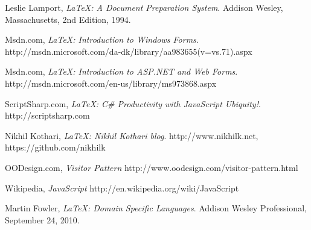 \begin{thebibliography}{9}
  Leslie Lamport,
  \emph{\LaTeX: A Document Preparation System}.
  Addison Wesley, Massachusetts,
  2nd Edition,
  1994.


  Msdn.com,
  \emph{\LaTeX: Introduction to Windows Forms}.
  http://msdn.microsoft.com/da-dk/library/aa983655(v=vs.71).aspx

  Msdn.com,
  \emph{\LaTeX: Introduction to ASP.NET and Web Forms}.
  http://msdn.microsoft.com/en-us/library/ms973868.aspx

  ScriptSharp.com,
  \emph{\LaTeX: C\# Productivity with JavaScript Ubiquity!}.
  http://scriptsharp.com

  Nikhil Kothari,
  \emph{\LaTeX: Nikhil Kothari blog}.
  http://www.nikhilk.net, https://github.com/nikhilk
  
  OODesign.com,
  \emph{Visitor Pattern}
  http://www.oodesign.com/visitor-pattern.html

  Wikipedia,
  \emph{JavaScript}
  http://en.wikipedia.org/wiki/JavaScript

  Martin Fowler,
  \emph{\LaTeX: Domain Specific Languages}.
  Addison Wesley Professional,
  September 24, 2010.

\end{thebibliography}










